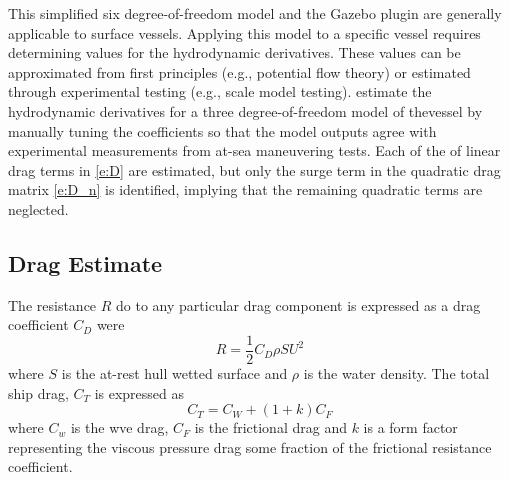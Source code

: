\documentclass[11pt, letterpaper]{article}
\begin{document}
This simplified six degree-of-freedom model and the Gazebo plugin are generally applicable to surface vessels.  Applying this model to a specific vessel requires determining values for the hydrodynamic derivatives.  These values can be approximated from first principles (e.g., potential flow theory) or estimated through experimental testing (e.g., scale model testing).  \citet{sarda16station} estimate the hydrodynamic derivatives for a three degree-of-freedom model of thevessel by manually tuning the coefficients so that the model outputs agree with experimental measurements from at-sea maneuvering tests.  Each of the of linear drag terms in  \eqref{e:D} are estimated, but only the surge term in the quadratic drag matrix \eqref{e:D_n} is identified, implying that the remaining quadratic terms are neglected.

\subsection{Drag Estimate}

The resistance $R$ do to any particular drag component is expressed as a drag coefficient $C_D$ were
\[
R = \frac{1}{2}C_D \rho S U^2
\]
where $S$ is the at-rest hull wetted surface and $\rho$ is the water density. The total ship drag, $C_T$ is expressed as
\[
C_T = C_W + (1+k) C_F
\]
where $C_w$ is the wve drag, $C_F$ is the frictional drag and $k$ is a form factor representing the viscous pressure drag some fraction of the frictional resistance coefficient.
\end{document}
